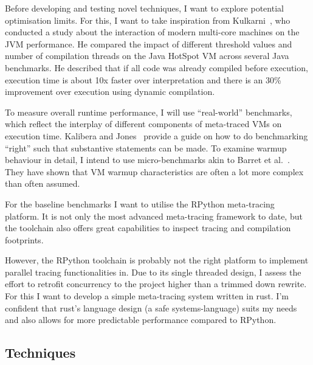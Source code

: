 Before developing and testing novel techniques, I want to explore potential
optimisation limits. For this, I want to take inspiration from
Kulkarni~\cite{kulkarni2011jit}, who conducted a study about the interaction of
modern multi-core machines on the JVM performance. He compared the impact of
different threshold values and number of compilation threads on the Java HotSpot
VM across several Java benchmarks. He described that if all code was already
compiled before execution, execution time is about 10x faster over
interpretation and there is an 30\% improvement over execution using dynamic
compilation.

To measure overall runtime performance, I will use ``real-world'' benchmarks, which
reflect the interplay of different components of meta-traced VMs on execution
time. Kalibera and Jones~\cite{kalibera2013rigorous} provide a guide on how to
do benchmarking ``right'' such that substantive statements can be made.
To examine warmup behaviour in detail, I intend to use micro-benchmarks akin to
Barret et al.~\cite{barrett2016virtual}. They have shown that VM warmup
characteristics are often a lot more complex than often assumed.

For the baseline benchmarks I want to utilise the RPython meta-tracing platform.
It is not only the most advanced meta-tracing framework to date, but the
toolchain also offers great capabilities to inspect tracing and compilation
footprints.

However, the RPython toolchain is probably not the right platform to
implement parallel tracing functionalities in. Due to its single threaded design,
I assess the effort to retrofit concurrency to the project higher than a trimmed
down rewrite. For this I want to develop a simple meta-tracing system written in
rust. I'm confident that rust's language design (a safe systems-language) suits
my needs and also allows for more predictable performance compared to RPython.






\subsection{Techniques}

